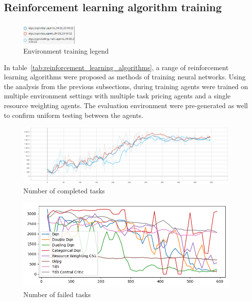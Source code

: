 
\subsection{Reinforcement learning algorithm training}\label{subsec:reinforcement-learning-algorithm-training}
\begin{figure}
    \includegraphics[width=0.25\textwidth]{figures/5_evaluation_figs/algo_training_fig/legend.PNG}
    \caption{Environment training legend}
    \label{fig:algo-training-legend}
\end{figure}

In table~\ref{tab:reinforcement_learning_algorithms}, a range of reinforcement learning algorithms were proposed as
methods of training neural networks. Using the analysis from the previous subsections, during training agents were
trained on multiple environment settings with multiple task pricing agents and a single resource weighting agents.
The evaluation environment were pre-generated as well to confirm uniform testing between the agents. \\

\begin{figure}[H]
    \centering
    \includegraphics[width=\linewidth]{figures/5_evaluation_figs/algo_training_fig/num_completed_tasks.PNG}
    \caption{Number of completed tasks}
    \label{fig:algo_num_completed_tasks}
\end{figure}

\begin{figure}[H]
    \centering
    \includegraphics[width=\linewidth]{figures/5_evaluation_figs/algo_training_fig/num_failed_tasks.png}
    \caption{Number of failed tasks}
    \label{fig:algo_num_failed_tasks}
\end{figure}

